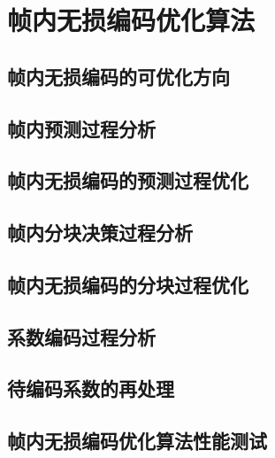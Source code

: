 \chapter{帧内无损编码优化算法}
\label{cha:c3}

\section{帧内无损编码的可优化方向}

\section{帧内预测过程分析}
\label{cha:IntraPredDetail}

\section{帧内无损编码的预测过程优化}

\section{帧内分块决策过程分析}

\section{帧内无损编码的分块过程优化}

\section{系数编码过程分析}

\section{待编码系数的再处理}

\section{帧内无损编码优化算法性能测试}